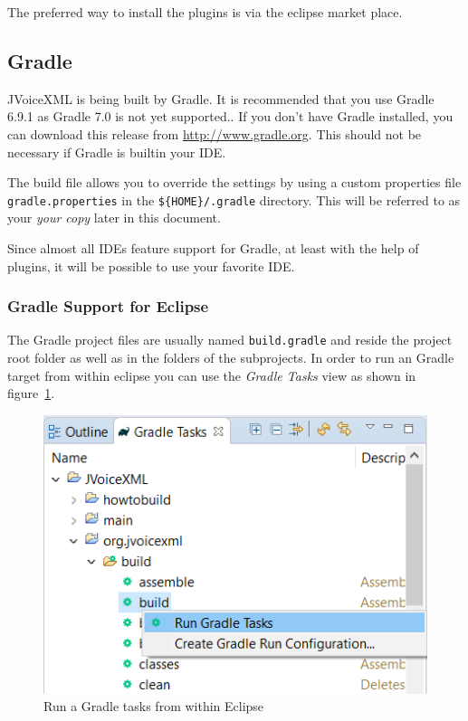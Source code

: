 \documentclass[11pt,a4paper]{article}
\begin{document}
The preferred way to install the plugins is via the eclipse market place.

\subsection{Gradle}
\label{sec:gradle}

JVoiceXML is being built by Gradle. It is recommended that
you use Gradle 6.9.1 as Gradle 7.0 is not yet supported.. 
If you don't have Gradle installed, you can download this release
from \url{http://www.gradle.org}. This should not be necessary if Gradle is builtin
your IDE.

The build file allows you to override the settings by using a custom 
properties file \texttt{gradle.properties} in the \texttt{\$\{HOME\}/.gradle}
directory. This will be referred to as your \emph{your copy} later in this document.

Since almost all IDEs feature support for Gradle, at least with the help of plugins, it will be possible to
use your favorite IDE.


\subsubsection{Gradle Support for Eclipse}
\label{sec:gradle-eclipse}

The Gradle project files are usually named \texttt{build.gradle} and reside the 
project root folder as well as in the folders of the subprojects. 
In order to run an Gradle target from within
eclipse you can use the \emph{Gradle Tasks} view as shown in
figure~\ref{fig:eclipse-run-gradle}.
\begin{figure}
\includegraphics[width=\linewidth]{eclipse-run-gradle}
\caption{Run a Gradle tasks from within Eclipse}
\label{fig:eclipse-run-gradle}
\end{figure}
\end{document}

